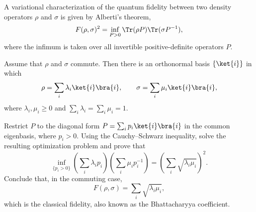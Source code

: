 A variational characterization of the quantum fidelity between two density operators $\rho$ and $\sigma$ is given by Alberti's theorem,
$$
F(\rho,\sigma)^2
=
\inf_{P>0}
\Tr(\rho P)\Tr(\sigma P^{-1}),
$$
where the infimum is taken over all invertible positive-definite operators $P$.

Assume that $\rho$ and $\sigma$ commute. Then there is an orthonormal basis $\{\ket{i}\}$ in which
$$
\rho=\sum_i \lambda_i \ket{i}\bra{i},
\qquad
\sigma=\sum_i \mu_i \ket{i}\bra{i},
$$
where $\lambda_i,\mu_i\geq 0$ and $\sum_i\lambda_i=\sum_i\mu_i=1.$

Restrict $P$ to the diagonal form $P=\sum_i p_i \ket{i}\bra{i}$ in the common eigenbasis, where $p_i>0$.
Using the Cauchy--Schwarz inequality, solve the resulting optimization problem and prove that
$$
\inf_{\{p_i>0\}}
\left(
\sum_i \lambda_i p_i
\right)
\left(
\sum_i \mu_i p_i^{-1}
\right)
=
\left(
\sum_i \sqrt{\lambda_i\mu_i}
\right)^2.
$$
Conclude that, in the commuting case,
$$
F(\rho,\sigma)
=
\sum_i \sqrt{\lambda_i\mu_i},
$$
which is the classical fidelity, also known as the Bhattacharyya coefficient.
